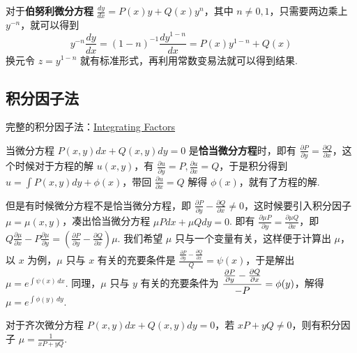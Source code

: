 对于\textbf{伯努利微分方程} $\displaystyle \frac{dy}{dx}=P(x)y+Q(x)y^{n}$，其中 $\displaystyle n\neq0,1$，只需要两边乘上 $\displaystyle y^{-n}$，就可以得到
$$
    y^{-n}\frac{dy}{dx}=(1-n)^{-1}\frac{dy^{1-n}}{dx}=P(x)y^{1-n}+Q(x)
$$
换元令 $\displaystyle z=y^{1-n}$ 就有标准形式，再利用常数变易法就可以得到结果.

\subsection{积分因子法}

完整的积分因子法：\href{https://math.libretexts.org/Courses/Mount_Royal_University/MATH_2200%3A_Calculus_for_Scientists_II/Appendix/A1%3A_Introduction_to_Differential_Equations/3.8%3A_Integrating_Factors}{Integrating Factors}

当微分方程 $\displaystyle P(x,y)dx+Q(x,y)dy=0$ 是\textbf{恰当微分方程}时，即有 $\displaystyle \frac{ \partial P }{ \partial y }=\frac{ \partial Q }{ \partial x }$，这个时候对于方程的解 $\displaystyle u(x,y)$，有 $\displaystyle \frac{ \partial u }{ \partial y }=P,\frac{ \partial u }{ \partial x }=Q$，于是积分得到 $\displaystyle u=\int P(x,y)dy+\phi(x)$，带回 $\displaystyle \frac{ \partial u }{ \partial x }=Q$ 解得 $\displaystyle \phi(x)$，就有了方程的解.

但是有时候微分方程不是恰当微分方程，即 $\displaystyle \frac{ \partial P }{ \partial y }-\frac{ \partial Q }{ \partial x }\neq0$，这时候要引入积分因子 $\displaystyle \mu=\mu(x,y)$，凑出恰当微分方程 $\displaystyle \mu Pdx+\mu Qdy=0$. 即有 $\displaystyle \frac{ \partial \mu P }{ \partial y }=\frac{ \partial \mu Q }{ \partial x }$，即 $\displaystyle Q\frac{ \partial \mu }{ \partial x }-P\frac{ \partial \mu  }{ \partial y }=\left( \frac{ \partial P }{ \partial y }-\frac{ \partial Q }{ \partial x } \right)\mu$. 我们希望 $\displaystyle \mu$ 只与一个变量有关，这样便于计算出 $\displaystyle \mu$，以 $x$ 为例，$\displaystyle \mu$ 只与 $x$ 有关的充要条件是 $\displaystyle \frac{\frac{ \partial P }{ \partial y }-\frac{ \partial Q }{ \partial x }}{Q}=\psi(x)$，于是解出 $\displaystyle \mu=e^{ \int \psi(x) \, dx }$. 同理，$\displaystyle \mu$ 只与 $\displaystyle y$ 有关的充要条件为 $\displaystyle \displaystyle \frac{\frac{ \partial P }{ \partial y }-\frac{ \partial Q }{ \partial x }}{-P}=\phi(y)$，解得 $\displaystyle \mu=e^{ \int \phi(y) \, dy }$.

\begin{exercise}
    对于齐次微分方程 $\displaystyle P(x,y)dx+Q(x,y)dy=0$，若 $\displaystyle xP+yQ\neq0$，则有积分因子 $\displaystyle \mu=\frac{1}{xP+yQ}$.
\end{exercise}

